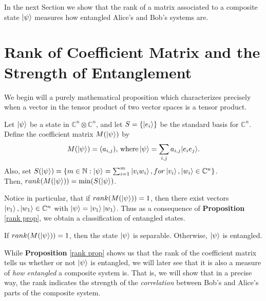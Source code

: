 In the next Section we show that the rank of a matrix associated to a composite state $\ket{\psi}$ measures how entangled Alice's and Bob's systems are.

\pagebreak

\section{Rank of Coefficient Matrix and the Strength of Entanglement}

We begin will a purely mathematical proposition which characterizes precisely when a vector in the tensor product of two vector spaces is a tensor product.

\begin{prop}
\label{rank prop}
Let $\ket{\psi}$ be a state in $\mathbb{C}^n \otimes \mathbb{C}^n$, and let $S=\{\ket{e_i}\}$ be the standard basis for $\mathbb{C}^n$. Define the coefficient matrix $M(\ket{\psi})$ by
\begin{equation}
M(\ket{\psi})=(a_{i,j}) \textrm{, where}\ket{\psi}=\sum\limits_{i,j}a_{i,j}|e_i e_j\rangle . 
\end{equation}
Also, set $S(\ket{\psi})=\{m\in \mathbb{N}: \ket{\psi}=\sum_{i=1}^m\ket{v_i w_i}, for \ket{v_i}, \ket{w_i} \in \mathbb{C}^n\}$.\\  Then, $rank(M(\ket{\psi}))=\textrm{min} (S(\ket{\psi})$.
\end{prop}

Notice in particular, that if $rank(M(\ket{\psi}))=1$, then there exist vectors $\ket{v_1}, \ket{w_1} \in \mathbb{C}^n$ with $\ket{\psi}=\ket{v_1}\ket{w_1}$.  Thus as a consequence of {\bf{Proposition}} \ref{rank prop}, we obtain a classification of entangled states.
\begin{corollary}
If $rank(M(\ket{\psi}))=1$, then the state $\ket{\psi}$ is separable. Otherwise, $\ket{\psi}$ is entangled.
\end{corollary}

While {\bf{Proposition}} \ref{rank prop} shows us that the rank of the coefficient matrix tells us whether or not $\ket{\psi}$ is entangled, we will later see that it is also a measure of {\emph{how entangled}} a composite system is. That is, we will show that in a precise way, the rank indicates the strength of the {\emph{correlation}} between Bob's and Alice's parts of the composite system.

